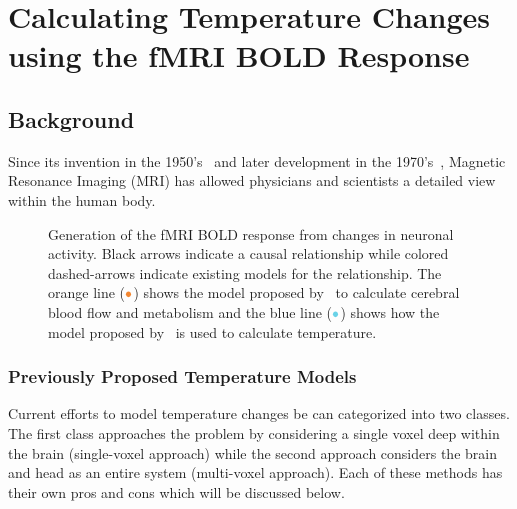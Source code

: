 \chapter{Calculating Temperature Changes using the fMRI BOLD Response}

\section{Background}
  
  Since its invention in the 1950's~\citep{carr1954} and later development in the 1970's~\citep{lauterbur1973}, {M}agnetic {R}esonance {I}maging ({MRI}) has allowed physicians and scientists a detailed view within the human body.
    \begin{figure}[bt]
      \centering
      \vspace{10pt}
      
      \caption[Generation of the fMRI BOLD response and a corresponding temperature change]{\label{fig:flowchart} Generation of the fMRI BOLD response from changes in neuronal activity.  Black arrows indicate a causal relationship while colored dashed-arrows indicate existing models for the relationship.  The orange line ($\color{goldfish}\bullet$) shows the model proposed by~\citet{sotero2011} to calculate cerebral blood flow and metabolism and the blue line ($\color{aoi}\bullet$) shows how the model proposed by~\citet{collins} is used to calculate temperature.}
    \end{figure}
    
  \subsection{\label{ss:previousmodels} Previously Proposed Temperature Models}
  Current efforts to model temperature changes be can categorized into two classes.  The first class approaches the problem by considering a single voxel deep within the brain (single-voxel approach) while the second approach considers the brain and head as an entire system (multi-voxel approach).  Each of these methods has their own pros and cons which will be discussed below.

